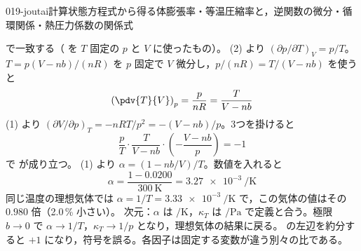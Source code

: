 \documentclass[uplatex,dvipdfmx,a4paper,11pt]{jsarticle}
\begin{document}
\begin{mondai}{019-joutai}{計算}{状態方程式から得る体膨張率・等温圧縮率と，逆関数の微分・循環関係・熱圧力係数の関係式}
\begin{tadashii}
で一致する（ を $T$ 固定の $p$ と $V$ に使ったもの）。
 (2) より $(\partial p/\partial T)_{V} = p/T$。$T = p(V - nb)/(nR)$ を $p$ 固定で $V$ 微分し，$p/(nR) = T/(V - nb)$ を使うと
\[ \left(\pdv{T}{V}\right)_{p} = \frac{p}{nR} = \frac{T}{V - nb} \]
(1) より $(\partial V/\partial p)_{T} = -nRT/p^{2} = -(V - nb)/p$。3つを掛けると
\[ \frac{p}{T}\cdot\frac{T}{V - nb}\cdot\left(-\frac{V - nb}{p}\right) = -1 \]
で  が成り立つ。
 (1) より $\alpha = (1 - nb/V)/T$。数値を入れると
\[ \alpha = \frac{1 - 0.0200}{\qty{300}{\kelvin}} = \qty{3.27e-3}{\per\kelvin} \]
同じ温度の理想気体では $\alpha = 1/T = \qty{3.33e-3}{\per\kelvin}$ で，この気体の値はその $0.980$ 倍（2.0\,\% 小さい）。
\kenzan 次元：$\alpha$ は $\unit{\per\kelvin}$，$\kappa_{T}$ は $\unit{\per\pascal}$ で定義と合う。極限 $b \to 0$ で $\alpha \to 1/T$，$\kappa_{T} \to 1/p$ となり，理想気体の結果に戻る。
\tsumazuki {} の左辺を約分すると $+1$ になり，符号を誤る。各因子は固定する変数が違う別々の比である。
\end{tadashii}
\end{mondai}
\end{document}
